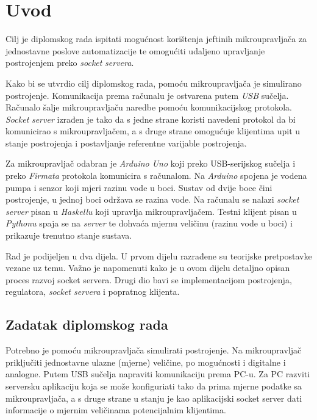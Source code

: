 \setcounter{page}{1}

\chapter{Uvod} \label{introduction}

Cilj je diplomskog rada ispitati mogućnost korištenja jeftinih mikroupravljača
za jednostavne poslove automatizacije te omogućiti udaljeno upravljanje
postrojenjem preko \emph{socket} \emph{servera}.

Kako bi se utvrdio cilj diplomskog rada, pomoću mikroupravljača je simulirano
postrojenje. Komunikacija prema računalu je ostvarena putem \emph{USB}
sučelja. Računalo šalje mikroupravljaču naredbe pomoću komunikacijskog
protokola. \emph{Socket} \emph{server} izrađen je tako da s jedne strane koristi
navedeni protokol da bi komunicirao s mikroupravljačem, a s druge strane
omogućuje klijentima upit u stanje postrojenja i postavljanje referentne
varijable postrojenja.

Za mikroupravljač odabran je \emph{Arduino Uno} koji preko USB-serijskog sučelja
i preko \emph{Firmata} protokola komunicira s računalom. Na \emph{Arduino}
spojena je vodena pumpa i senzor koji mjeri razinu vode u boci. Sustav od dvije
boce čini postrojenje, u jednoj boci održava se razina vode. Na računalu se
nalazi \emph{socket} \emph{server} pisan u \emph{Haskellu} koji upravlja
mikroupravljačem. Testni klijent pisan u \emph{Pythonu} spaja se na
\emph{server} te dohvaća mjernu veličinu (razinu vode u boci) i prikazuje
trenutno stanje sustava.

Rad je podijeljen u dva dijela. U prvom dijelu razrađene su teorijske
pretpostavke vezane uz temu. Važno je napomenuti kako je u ovom dijelu detaljno
opisan proces razvoj socket servera. Drugi dio bavi se implementacijom
postrojenja, regulatora, \emph{socket servera} i popratnog klijenta.

\section{Zadatak diplomskog rada}

Potrebno je pomoću mikroupravljača simulirati postrojenje. Na mikroupravljač
priključiti jednostavne ulazne (mjerne) veličine, po mogućnosti i digitalne i
analogne. Putem USB sučelja napraviti komunikaciju prema PC-u. Za PC razviti
serversku aplikaciju koja se može konfiguriati tako da prima mjerne podatke sa
mikroupravljača, a s druge strane u stanju je kao aplikacijski socket server
dati informacije o mjernim veličinama potencijalnim klijentima.
